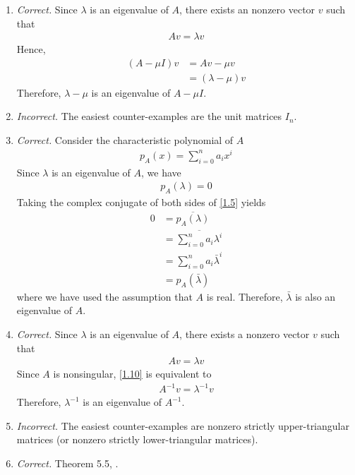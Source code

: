 \documentclass[a4paper,oneside]{book}
\numberwithin{equation}{chapter}
\begin{document}
\begin{enumerate}
\item \textit{Correct.} Since $\lambda$ is an eigenvalue of $A$, there exists an nonzero vector $v$ such that
\begin{align}
Av=\lambda v
\end{align}
Hence,
\begin{align}
\left( {A - \mu I} \right)v &= Av - \mu v\\
& = \left( {\lambda  - \mu } \right)v
\end{align}
Therefore, $\lambda -\mu$ is an eigenvalue of $A-\mu I$.
\item \textit{Incorrect.} The easiest counter-examples are the unit matrices $I_n$.
\item \textit{Correct.} Consider the characteristic polynomial of $A$
\begin{align}
{p_A}\left( x \right) = \sum\limits_{i = 0}^n {{a_i}{x^i}} 
\end{align}
Since $\lambda$ is an eigenvalue of $A$, we have
\begin{align}
\label{1.5}
{p_A}\left( \lambda  \right) = 0
\end{align}
Taking the complex conjugate of both sides of \eqref{1.5} yields
\begin{align}
0 & = \overline {{p_A}\left( \lambda  \right)} \\
 &= \overline {\sum\limits_{i = 0}^n {{a_i}{\lambda ^i}} } \\
 &= \sum\limits_{i = 0}^n {{a_i}{{\bar \lambda }^i}} \\
 &= {p_A}\left( {\bar \lambda } \right)
\end{align}
where we have used the assumption that $A$ is real. Therefore, $\bar \lambda$ is also an eigenvalue of $A$.
\item \textit{Correct.} Since $\lambda$ is an eigenvalue of $A$, there exists a nonzero vector $v$ such that
\begin{align}
\label{1.10}
Av = \lambda v
\end{align}
Since $A$ is nonsingular, \eqref{1.10} is equivalent to
\begin{align}
{A^{ - 1}}v = {\lambda ^{ - 1}}v
\end{align}
Therefore, $\lambda ^{-1}$ is an eigenvalue of $A^{-1}$.
\item \textit{Incorrect.} The easiest counter-examples are nonzero strictly upper-triangular matrices (or nonzero strictly lower-triangular matrices).
\item \textit{Correct.} Theorem 5.5, \cite{1}.

\end{enumerate}
\end{document}
